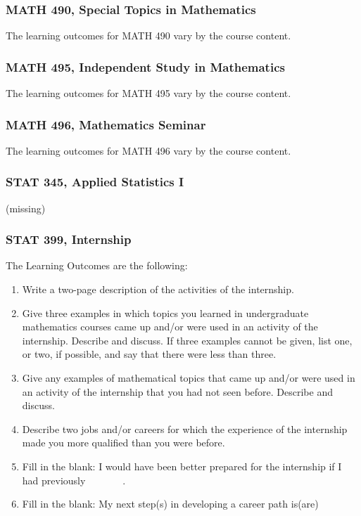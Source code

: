 \documentclass[11pt]{article}
\newenvironment{alphalist}{
\begin{enumerate}[label=(\arabic*),widest=107 ,leftmargin=25pt, itemsep=0pt]}
{\end{enumerate}}
\begin{document}
\subsubsection{MATH 490, Special Topics in Mathematics}

The learning outcomes for MATH 490 vary by the course content.

\subsubsection{MATH 495, Independent Study in Mathematics}


The learning outcomes for MATH 495 vary by the course content.

\subsubsection{MATH 496, Mathematics Seminar}

The learning outcomes for MATH 496 vary by the course content.


\subsubsection{STAT 345, Applied Statistics I}

(missing)

\subsubsection{STAT 399, Internship}

The Learning Outcomes are the following:
\begin{alphalist}
    \item Write a two-page description of the activities of the internship.
    \item Give three examples in which topics you learned in 
    undergraduate mathematics courses came up and/or were used in an activity of the internship. Describe and discuss. If three examples cannot be given, list one, or two, if possible, and say that there were less than three.
    \item Give any examples of mathematical topics that came up and/or were used in an activity of the internship that you had not seen before. Describe and discuss. 
    \item Describe two jobs and/or careers for which the experience of the internship made you more qualified than you were before.
    \item Fill in the blank: I would have been better prepared for the internship if I had previously \underline{$\phantom{xxxxxx}$}.
    \item Fill in the blank: My next step(s) in developing a career path is(are) \underline{$\phantom{xxxxxx}$}
\end{alphalist}
\end{document}
